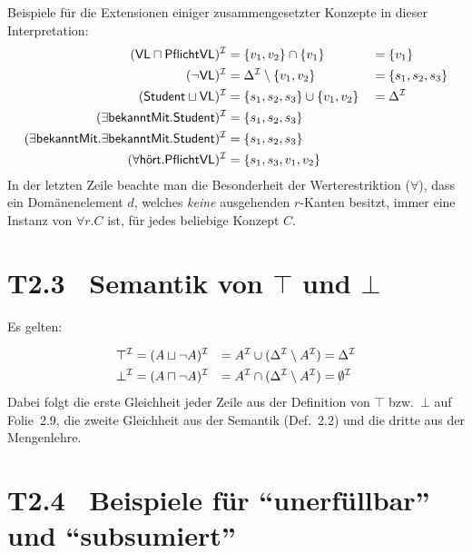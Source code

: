 \documentclass[fontsize=11pt, twoside=false, numbers=autoenddot]{scrbook}
\begin{document}
%
Beispiele für die Extensionen einiger zusammengesetzter Konzepte in dieser Interpretation:
%
\begin{alignat*}{2}
  (\textsf{VL} \sqcap \textsf{PflichtVL})^\mathcal{I} & = \{v_1,v_2\} \cap \{v_1\}          && = \{v_1\} \\
  (\lnot\textsf{VL})^\mathcal{I}                    & = \Delta^\mathcal{I} \setminus \{v_1,v_2\} && = \{s_1,s_2,s_3\} \\
  (\textsf{Student} \sqcup \textsf{VL})^\mathcal{I}   & = \{s_1,s_2,s_3\} \cup \{v_1,v_2\} && = \Delta^\mathcal{I} \\
  (\exists\textsf{bekanntMit}.\textsf{Student})^\mathcal{I} & = \{s_1,s_2,s_3\} \\
  (\exists\textsf{bekanntMit}.\exists\textsf{bekanntMit}.\textsf{Student})^\mathcal{I} & = \{s_1,s_2,s_3\} \\
  (\forall\textsf{hört}.\textsf{PflichtVL})^\mathcal{I} & = \{s_1,s_3,v_1,v_2\}
\end{alignat*}
%
In der letzten Zeile beachte man die Besonderheit der Werterestriktion ($\forall$),
dass ein Domänenelement $d$, welches \emph{keine} ausgehenden $r$-Kanten besitzt,
immer eine Instanz von $\forall r.C$ ist, für jedes beliebige Konzept $C$.

\section*{T2.3~ Semantik von {\boldmath $\top$ und $\bot$}}

Es gelten:
%
\par\vspace*{-2.7\baselineskip}
\begin{alignat*}{4}
  \top^\mathcal{I} & = (A \sqcup \lnot A)^\mathcal{I} & = A^\mathcal{I} \cup (\Delta^\mathcal{I} \setminus A^\mathcal{I}) & = \Delta^\mathcal{I} \\
  \bot^\mathcal{I} & = (A \sqcap \lnot A)^\mathcal{I} & = A^\mathcal{I} \cap (\Delta^\mathcal{I} \setminus A^\mathcal{I}) & = \emptyset^\mathcal{I}
\end{alignat*}
%
Dabei folgt die erste Gleichheit jeder Zeile aus der Definition von $\top$ bzw.\ $\bot$
auf Folie~2.9,
die zweite Gleichheit aus der Semantik (Def.~2.2)
und die dritte aus der Mengenlehre.

\pagebreak
\section*{T2.4~ Beispiele für "`unerfüllbar"' und "`subsumiert"'}
\end{document}
